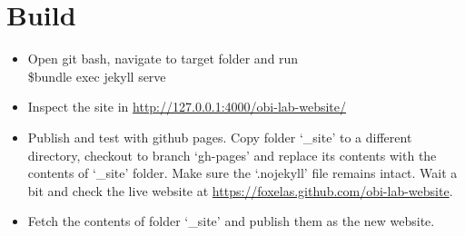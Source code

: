 \documentclass[12pt, letterpaper]{article}
\begin{document}
\section{Build}
\begin{itemize}
\item Open git bash, navigate to target folder and run \\
\$bundle exec jekyll serve
\item Inspect the site in \url{http://127.0.0.1:4000/obi-lab-website/}
\item Publish and test with github pages. Copy folder `\_site' to a different directory, checkout to branch `gh-pages' and replace its contents with the contents of `\_site' folder. Make sure the `.nojekyll' file remains intact.  Wait a bit and check the live website at \url{https://foxelas.github.com/obi-lab-website}. 
\item Fetch the contents of folder `\_site' and publish them as the new website.
\end{itemize}
\end{document}
